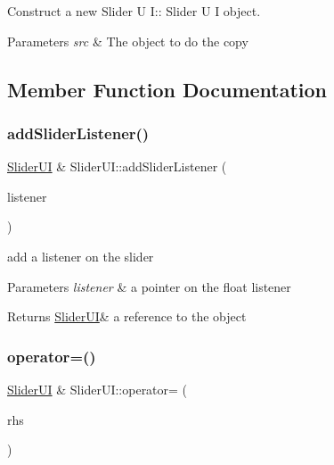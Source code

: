 Construct a new Slider U I\+:\+: Slider U I object. 


\begin{DoxyParams}{Parameters}
{\em src} & The object to do the copy \\
\hline
\end{DoxyParams}


\subsection{Member Function Documentation}
\mbox{\label{class_slider_u_i_a10fa6883edf4a3bc6a089738df191183}} 
\subsubsection{\texorpdfstring{add\+Slider\+Listener()}{addSliderListener()}}
{\footnotesize\ttfamily \hyperlink{class_slider_u_i}{Slider\+UI} \& Slider\+U\+I\+::add\+Slider\+Listener (\begin{DoxyParamCaption}\item[{float $\ast$}]{listener }\end{DoxyParamCaption})}



add a listener on the slider 


\begin{DoxyParams}{Parameters}
{\em listener} & a pointer on the float listener \\
\hline
\end{DoxyParams}
\begin{DoxyReturn}{Returns}
\hyperlink{class_slider_u_i}{Slider\+UI}\& a reference to the object 
\end{DoxyReturn}
\mbox{\label{class_slider_u_i_a69de2528b6428c341572667a4154e1c9}} 
\subsubsection{\texorpdfstring{operator=()}{operator=()}}
{\footnotesize\ttfamily \hyperlink{class_slider_u_i}{Slider\+UI} \& Slider\+U\+I\+::operator= (\begin{DoxyParamCaption}\item[{\hyperlink{class_slider_u_i}{Slider\+UI} const \&}]{rhs }\end{DoxyParamCaption})}



